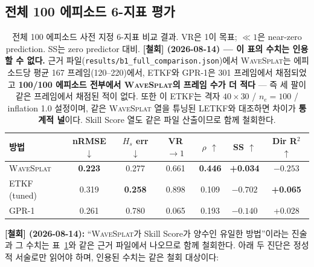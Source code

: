 \documentclass[11pt]{report}
\numberwithin{equation}{chapter}
\numberwithin{figure}{chapter}
\numberwithin{table}{chapter}
\newcommand{\WS}{\textsc{WaveSplat}}
\begin{document}
\subsection{전체 100 에피소드 6-지표 평가}
\label{sec:full_eval}

\begin{table}[htbp]
\centering
\caption{전체 100 에피소드 사전 지정 6-지표 비교 결과.
VR은 1이 목표; $\ll 1$은 near-zero prediction. SS는 zero predictor 대비.
\textbf{[철회] (2026-08-14) --- 이 표의 수치는 인용할 수 없다.}
근거 파일(\texttt{results/b1\_full\_comparison.json})에서 \WS{}는 에피소드당 평균
167 프레임(120--220)에서, ETKF와 GPR-1은 301 프레임에서 채점되었고
\textbf{100/100 에피소드 전부에서 \WS{}의 프레임 수가 더 적다} ---
즉 세 팔이 같은 프레임에서 채점된 적이 없다.
또한 이 ETKF는 격자 $40\times30$ / $n_e{=}100$ / inflation 1.0 설정이며,
같은 \WS{} 열을 튜닝된 LETKF와 대조하면 차이가 \textbf{통계적 널}이다.
Skill Score 열도 같은 파일 산출이므로 함께 철회한다.}
\label{tab:main_results}
\small
\begin{tabular}{lcccccc}
\toprule
방법 & nRMSE $\downarrow$ & $H_s$ err $\downarrow$ & VR $\to1$ & $\rho$ $\uparrow$ & SS $\uparrow$ & Dir R$^2$ $\uparrow$ \\
\midrule
\WS{} & \textbf{0.223} & 0.277 & 0.661 & \textbf{0.446} & \textbf{+0.034} & $-0.253$ \\
ETKF (tuned) & 0.319 & \textbf{0.258} & 0.898 & 0.109 & $-0.702$ & \textbf{+0.065} \\
GPR-1 & 0.261 & 0.780 & 0.065 & 0.193 & $-0.140$ & +0.028 \\
\bottomrule
\end{tabular}
\end{table}

\textbf{[철회] (2026-08-14):} ``\WS{}가 Skill Score가 양수인 유일한 방법''이라는 진술과
그 수치는 표~\ref{tab:main_results}와 같은 근거 파일에서 나오므로 함께 철회한다.
아래 두 진단은 정성적 서술로만 읽어야 하며, 인용된 수치는 같은 철회 대상이다:
\end{document}
